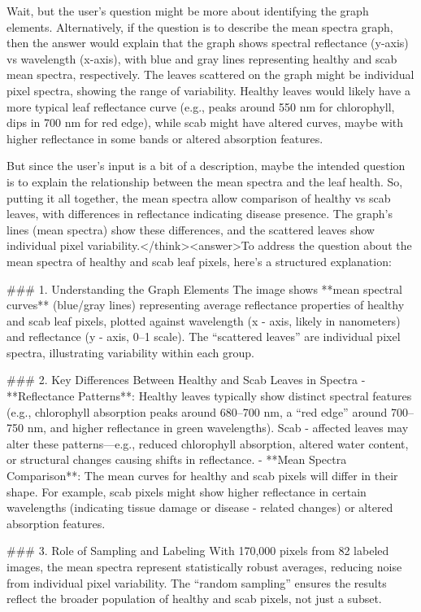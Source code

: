 Wait, but the user's question might be more about identifying the graph elements. Alternatively, if the question is to describe the mean spectra graph, then the answer would explain that the graph shows spectral reflectance (y-axis) vs wavelength (x-axis), with blue and gray lines representing healthy and scab mean spectra, respectively. The leaves scattered on the graph might be individual pixel spectra, showing the range of variability. Healthy leaves would likely have a more typical leaf reflectance curve (e.g., peaks around 550 nm for chlorophyll, dips in 700 nm for red edge), while scab might have altered curves, maybe with higher reflectance in some bands or altered absorption features.

But since the user's input is a bit of a description, maybe the intended question is to explain the relationship between the mean spectra and the leaf health. So, putting it all together, the mean spectra allow comparison of healthy vs scab leaves, with differences in reflectance indicating disease presence. The graph's lines (mean spectra) show these differences, and the scattered leaves show individual pixel variability.</think><answer>To address the question about the mean spectra of healthy and scab leaf pixels, here’s a structured explanation:  

### 1. Understanding the Graph Elements  
The image shows **mean spectral curves** (blue/gray lines) representing average reflectance properties of healthy and scab leaf pixels, plotted against wavelength (x - axis, likely in nanometers) and reflectance (y - axis, 0–1 scale). The “scattered leaves” are individual pixel spectra, illustrating variability within each group.    

### 2. Key Differences Between Healthy and Scab Leaves in Spectra  
- **Reflectance Patterns**: Healthy leaves typically show distinct spectral features (e.g., chlorophyll absorption peaks around 680–700 nm, a “red edge” around 700–750 nm, and higher reflectance in green wavelengths). Scab - affected leaves may alter these patterns—e.g., reduced chlorophyll absorption, altered water content, or structural changes causing shifts in reflectance.  
- **Mean Spectra Comparison**: The mean curves for healthy and scab pixels will differ in their shape. For example, scab pixels might show higher reflectance in certain wavelengths (indicating tissue damage or disease - related changes) or altered absorption features.    

### 3. Role of Sampling and Labeling  
With 170,000 pixels from 82 labeled images, the mean spectra represent statistically robust averages, reducing noise from individual pixel variability. The “random sampling” ensures the results reflect the broader population of healthy and scab pixels, not just a subset.    

